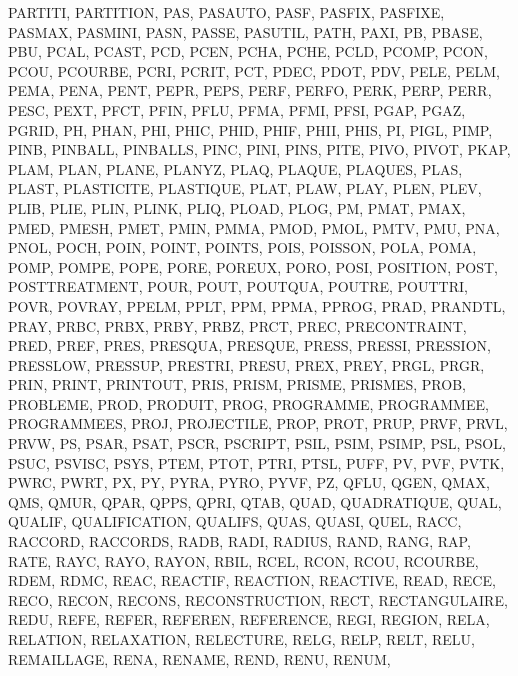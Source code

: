 {{{		PARTITI,
		PARTITION,
		PAS,
		PASAUTO,
		PASF,
		PASFIX,
		PASFIXE,
		PASMAX,
		PASMINI,
		PASN,
		PASSE,
		PASUTIL,
		PATH,
		PAXI,
		PB,
		PBASE,
		PBU,
		PCAL,
		PCAST,
		PCD,
		PCEN,
		PCHA,
		PCHE,
		PCLD,
		PCOMP,
		PCON,
		PCOU,
		PCOURBE,
		PCRI,
		PCRIT,
		PCT,
		PDEC,
		PDOT,
		PDV,
		PELE,
		PELM,
		PEMA,
		PENA,
		PENT,
		PEPR,
		PEPS,
		PERF,
		PERFO,
		PERK,
		PERP,
		PERR,
		PESC,
		PEXT,
		PFCT,
		PFIN,
		PFLU,
		PFMA,
		PFMI,
		PFSI,
		PGAP,
		PGAZ,
		PGRID,
		PH,
		PHAN,
		PHI,
		PHIC,
		PHID,
		PHIF,
		PHII,
		PHIS,
		PI,
		PIGL,
		PIMP,
		PINB,
		PINBALL,
		PINBALLS,
		PINC,
		PINI,
		PINS,
		PITE,
		PIVO,
		PIVOT,
		PKAP,
		PLAM,
		PLAN,
		PLANE,
		PLANYZ,
		PLAQ,
		PLAQUE,
		PLAQUES,
		PLAS,
		PLAST,
		PLASTICITE,
		PLASTIQUE,
		PLAT,
		PLAW,
		PLAY,
		PLEN,
		PLEV,
		PLIB,
		PLIE,
		PLIN,
		PLINK,
		PLIQ,
		PLOAD,
		PLOG,
		PM,
		PMAT,
		PMAX,
		PMED,
		PMESH,
		PMET,
		PMIN,
		PMMA,
		PMOD,
		PMOL,
		PMTV,
		PMU,
		PNA,
		PNOL,
		POCH,
		POIN,
		POINT,
		POINTS,
		POIS,
		POISSON,
		POLA,
		POMA,
		POMP,
		POMPE,
		POPE,
		PORE,
		POREUX,
		PORO,
		POSI,
		POSITION,
		POST,
		POSTTREATMENT,
		POUR,
		POUT,
		POUTQUA,
		POUTRE,
		POUTTRI,
		POVR,
		POVRAY,
		PPELM,
		PPLT,
		PPM,
		PPMA,
		PPROG,
		PRAD,
		PRANDTL,
		PRAY,
		PRBC,
		PRBX,
		PRBY,
		PRBZ,
		PRCT,
		PREC,
		PRECONTRAINT,
		PRED,
		PREF,
		PRES,
		PRESQUA,
		PRESQUE,
		PRESS,
		PRESSI,
		PRESSION,
		PRESSLOW,
		PRESSUP,
		PRESTRI,
		PRESU,
		PREX,
		PREY,
		PRGL,
		PRGR,
		PRIN,
		PRINT,
		PRINTOUT,
		PRIS,
		PRISM,
		PRISME,
		PRISMES,
		PROB,
		PROBLEME,
		PROD,
		PRODUIT,
		PROG,
		PROGRAMME,
		PROGRAMMEE,
		PROGRAMMEES,
		PROJ,
		PROJECTILE,
		PROP,
		PROT,
		PRUP,
		PRVF,
		PRVL,
		PRVW,
		PS,
		PSAR,
		PSAT,
		PSCR,
		PSCRIPT,
		PSIL,
		PSIM,
		PSIMP,
		PSL,
		PSOL,
		PSUC,
		PSVISC,
		PSYS,
		PTEM,
		PTOT,
		PTRI,
		PTSL,
		PUFF,
		PV,
		PVF,
		PVTK,
		PWRC,
		PWRT,
		PX,
		PY,
		PYRA,
		PYRO,
		PYVF,
		PZ,
		QFLU,
		QGEN,
		QMAX,
		QMS,
		QMUR,
		QPAR,
		QPPS,
		QPRI,
		QTAB,
		QUAD,
		QUADRATIQUE,
		QUAL,
		QUALIF,
		QUALIFICATION,
		QUALIFS,
		QUAS,
		QUASI,
		QUEL,
		RACC,
		RACCORD,
		RACCORDS,
		RADB,
		RADI,
		RADIUS,
		RAND,
		RANG,
		RAP,
		RATE,
		RAYC,
		RAYO,
		RAYON,
		RBIL,
		RCEL,
		RCON,
		RCOU,
		RCOURBE,
		RDEM,
		RDMC,
		REAC,
		REACTIF,
		REACTION,
		REACTIVE,
		READ,
		RECE,
		RECO,
		RECON,
		RECONS,
		RECONSTRUCTION,
		RECT,
		RECTANGULAIRE,
		REDU,
		REFE,
		REFER,
		REFEREN,
		REFERENCE,
		REGI,
		REGION,
		RELA,
		RELATION,
		RELAXATION,
		RELECTURE,
		RELG,
		RELP,
		RELT,
		RELU,
		REMAILLAGE,
		RENA,
		RENAME,
		REND,
		RENU,
		RENUM,
}}}
